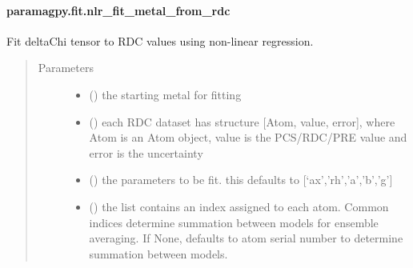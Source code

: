 \documentclass[a4paper,10pt,english]{sphinxmanual}
\begin{document}
\paragraph{paramagpy.fit.nlr\_fit\_metal\_from\_rdc}
\label{\detokenize{reference/generated/paramagpy.fit.nlr_fit_metal_from_rdc:paramagpy-fit-nlr-fit-metal-from-rdc}}\label{\detokenize{reference/generated/paramagpy.fit.nlr_fit_metal_from_rdc::doc}}

\begin{fulllineitems}
\label{\detokenize{reference/generated/paramagpy.fit.nlr_fit_metal_from_rdc:paramagpy.fit.nlr_fit_metal_from_rdc}}
Fit deltaChi tensor to RDC values using non-linear regression.
\begin{quote}\begin{description}
\item[{Parameters}] \leavevmode\begin{itemize}
\item {} 
 () \textendash{} the starting metal for fitting

\item {} 
 () \textendash{} each RDC dataset has structure {[}Atom, value, error{]}, where Atom is
an Atom object, value is the PCS/RDC/PRE value
and error is the uncertainty

\item {} 
 (\sphinxstyleliteralemphasis{\sphinxupquote{, }}) \textendash{} the parameters to be fit.
this defaults to {[}‘ax’,’rh’,’a’,’b’,’g’{]}

\item {} 
 (\sphinxstyleliteralemphasis{\sphinxupquote{, }}) \textendash{} the list contains an index assigned to each atom.
Common indices determine summation between models
for ensemble averaging.
If None, defaults to atom serial number to determine summation
between models.


\end{itemize}
\end{description}
\end{quote}
\end{fulllineitems}
\end{document}
